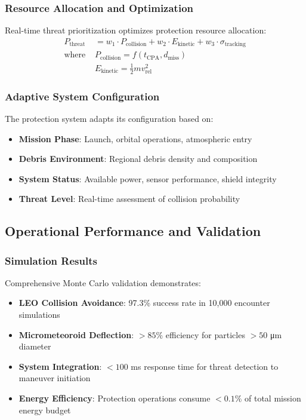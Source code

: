 \subsubsection{Resource Allocation and Optimization}
Real-time threat prioritization optimizes protection resource allocation:
\begin{align}
P_{\text{threat}} &= w_1 \cdot P_{\text{collision}} + w_2 \cdot E_{\text{kinetic}} + w_3 \cdot \sigma_{\text{tracking}} \\
\text{where } & P_{\text{collision}} = f(t_{\text{CPA}}, d_{\text{miss}}) \\
& E_{\text{kinetic}} = \frac{1}{2} m v^2_{\text{rel}}
\end{align}

\subsubsection{Adaptive System Configuration}
The protection system adapts its configuration based on:
\begin{itemize}
\item \textbf{Mission Phase}: Launch, orbital operations, atmospheric entry
\item \textbf{Debris Environment}: Regional debris density and composition
\item \textbf{System Status}: Available power, sensor performance, shield integrity
\item \textbf{Threat Level}: Real-time assessment of collision probability
\end{itemize}

\subsection{Operational Performance and Validation}

\subsubsection{Simulation Results}
Comprehensive Monte Carlo validation demonstrates:
\begin{itemize}
\item \textbf{LEO Collision Avoidance}: 97.3\% success rate in 10,000 encounter simulations
\item \textbf{Micrometeoroid Deflection}: $>85\%$ efficiency for particles $>50$ μm diameter
\item \textbf{System Integration}: $<100$ ms response time for threat detection to maneuver initiation
\item \textbf{Energy Efficiency}: Protection operations consume $<0.1\%$ of total mission energy budget
\end{itemize}

